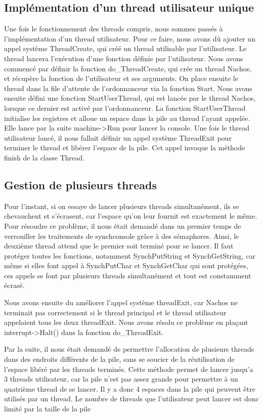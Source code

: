 \documentclass[10pt]{article}
\begin{document}
\subsection{Implémentation d'un thread utilisateur unique}
Une fois le fonctionnement des threads compris, nous sommes passés à l'implémentation d'un thread utilisateur.
Pour ce faire, nous avons dû ajouter un appel système ThreadCreate, qui créé un thread utilisable par l'utilisateur. Le thread lancera l'exécution d'une fonction définie par l'utilisateur.
Nous avons commencé par définir la fonction do\_ThreadCreate, qui crée un thread Nachos, et récupère la fonction de l'utilisateur et ses arguments. On place ensuite le thread dans la file d'attente de l'ordonnanceur via la fonction Start.
Nous avons ensuite défini une fonction StartUserThread, qui est lancée par le thread Nachos, lorsque ce dernier est activé par l'ordonnanceur.
La fonction StartUserThread initialise les registres et alloue un espace dans la pile au thread l'ayant appelée. Elle lance par la suite machine->Run pour lancer la console.
Une fois le thread utilisateur lancé, il nous fallait définir un appel système ThreadExit pour terminer le thread et libérer l'espace de la pile.
Cet appel invoque la méthode finish de la classe Thread.

\subsection{Gestion de plusieurs threads}
Pour l'instant, si on essaye de lancer plusieurs threads simultanément, ils se chevauchent et s'écrasent, car l'espace qu'on leur fournit est exactement le même.
Pour résoudre ce problème, il nous était demandé dans un premier temps de verrouiller les traitements de synchconsole grâce à des sémaphores. Ainsi, le deuxième thread attend que le premier soit terminé pour se lancer. Il faut protéger toutes les fonctions, notamment SynchPutString et SynchGetString, car même si elles font appel à SynchPutChar et SynchGetChar qui sont protégées, ces appels se font par plusieurs threads simultanément et tout est constamment écrasé.

Nous avons ensuite du améliorer l'appel système threadExit, car Nachos ne terminait pas correctement si le thread principal et le thread utilisateur appelaient tous les deux threadExit. Nous avons
résolu ce problème en plaçant interrupt->Halt() dans la fonction do\_ThreadExit.

Par la suite, il nous était demandé de permettre l'allocation de plusieurs threads dans des endroits différents de la pile, sans se soucier de la réutilisation de l'espace libéré par les threads terminés.
Cette méthode permet de lancer jusqu'a 3 threads utilisateur, car la pile n'est pas assez grande pour permettre à un quatrième thread de se lancer. Il y a donc 4 espaces dans la pile qui peuvent être utilisés par un thread.
Le nombre de threads que l'utilisateur peut lancer est donc limité
par la taille de la pile
\end{document}
